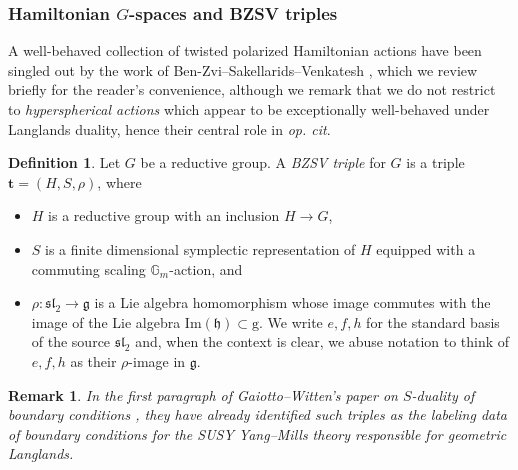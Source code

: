 \documentclass[11pt, a4paper]{amsart}
\numberwithin{equation}{section}
\newtheorem{remark}[theorem]{Remark}
\theoremstyle{definition}
\newtheorem{definition}[theorem]{Definition}
\theoremstyle{remark}
\newcommand{\g}{\mathrm{g}}
\newcommand{\GG}{\mathbb{G}}
\renewcommand{\to}{\longrightarrow}
\begin{document}
\subsubsection{Hamiltonian $G$-spaces and BZSV triples}

A well-behaved collection of twisted polarized Hamiltonian actions have been singled out by the work of Ben-Zvi--Sakellarids--Venkatesh \cite{BZSV}, which we review briefly for the reader's convenience, although we remark that we do not restrict to \textit{hyperspherical actions} which appear to be exceptionally well-behaved under Langlands duality, hence their central role in \textit{op. cit}.

\begin{definition} \label{definition BZSV triple}
    Let $G$ be a reductive group. A \textit{BZSV triple} for $G$ is a triple $\mathbf{t} = (H, S, \rho)$, where
    \begin{itemize}
        \item $H$ is a reductive group with an inclusion $H \to G$, 
        \item $S$ is a finite dimensional symplectic representation of $H$ equipped with a commuting scaling $\GG_m$-action, and
        \item $\rho: \mathfrak{sl}_2 \to \mathfrak{g}$ is a Lie algebra homomorphism whose image commutes with the image of the Lie algebra $\mathrm{Im}(\mathfrak{h}) \subset \g$. We write $e,f,h$ for the standard basis of the source $\mathfrak{sl}_2$ and, when the context is clear, we abuse notation to think of $e,f,h$ as their $\rho$-image in $\mathfrak{g}$. 
    \end{itemize}
\end{definition}





\begin{remark}
In the first paragraph of Gaiotto--Witten's paper on $S$-duality of boundary conditions \cite{gaiotto&witten}, they have already identified such triples as the labeling data of boundary conditions for the SUSY Yang--Mills theory responsible for geometric Langlands.
\end{remark}
\end{document}
